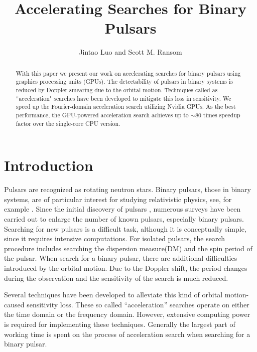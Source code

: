 \documentclass[preprint2]{aastex}
\begin{document}
\title{Accelerating Searches for Binary Pulsars}

\author{Jintao Luo and Scott M. Ransom}



\begin{abstract}
With this paper we present our work on accelerating searches for binary pulsars 
using graphics processing units (GPUs).
The detectability of pulsars in binary systems is reduced by Doppler smearing 
due to the orbital motion. Techniques called as ``acceleration" searches have been 
developed to mitigate  this loss in sensitivity. We speed up the Fourier-domain 
acceleration search utilizing Nvidia GPUs. As the best performance, the GPU-powered 
acceleration search achieves up to $\sim$80 times speedup factor over the single-core CPU version.
\end{abstract}


\section{Introduction}

Pulsars are recognized as rotating neutron stars. Binary pulsars, those in 
binary systems, are of particular interest for studying relativistic physics,
 see, for example \citet{tay89}. 
Since the initial discovery of pulsars\citep{hew68}
, numerous surveys have been carried out to enlarge the number of known pulsars, 
especially binary pulsars. Searching for new pulsars is a difficult task, although it is 
conceptually simple, since it requires intensive computations.
For isolated pulsars, the search procedure includes searching the dispersion measure(DM) 
and the spin period of the pulsar. When search for a binary pulsar, there 
are additional difficulties introduced by the orbital motion.
Due to the Doppler shift, the period changes during the observation and 
the sensitivity of the search is much reduced.

Several techniques have been developed to alleviate this kind of orbital motion-caused 
sensitivity loss\citep[e.g.][]{mid84}. These so called ``acceleration'' searches operate on 
either the time domain or the frequency domain. However, extensive computing 
power is required for implementing these techniques. Generally the largest part of 
working time is spent on the process of acceleration 
search when searching for a binary pulsar.
\end{document}
